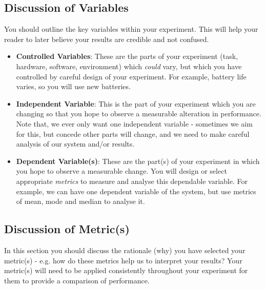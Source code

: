 \documentclass[conference]{IEEEtran}
\begin{document}
\subsection{Discussion of Variables}
You should outline the key variables within your experiment. This will help your reader to later believe your results are credible and not confused.
\begin{itemize}
    \item \textbf{Controlled Variables}: These are the parts of your experiment (task, hardware, software, environment) which \emph{could} vary, but which you have controlled by careful design of your experiment.  For example, battery life varies, so you will use new batteries.
    \item \textbf{Independent Variable}: This is the part of your experiment which you are changing so that you hope to observe a measurable alteration in performance.  Note that, we ever only want one independent variable - sometimes we aim for this, but concede other parts will change, and we need to make careful analysis of our system and/or results.
    \item \textbf{Dependent Variable(s)}: These are the part(s) of your experiment in which you hope to observe a measurable change.  You will design or select appropriate \emph{metrics} to measure and analyse this dependable variable.  For example, we can have one dependent variable of the system, but use metrics of mean, mode and median to analyse it.
\end{itemize}

\subsection{Discussion of Metric(s)}
 In this section you should discuss the rationale (why) you have selected your metric(s) - e.g. how do these metrics help us to interpret your results?  Your metric(s) will need to be applied consistently throughout your experiment for them to provide a comparison of performance.  
 
\end{document}
